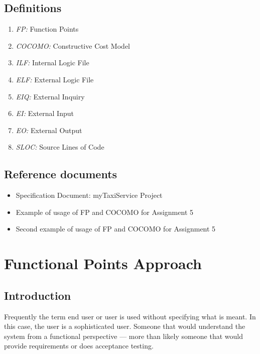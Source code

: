 \documentclass[12pt, oneside]{book}   	%
\begin{document}
\section{Definitions}
\begin{enumerate}
\item \textit{FP:} Function Points
\item \textit{COCOMO:} Constructive Cost Model
\item \textit{ILF:} Internal Logic File
\item \textit{ELF:} External Logic File
\item \textit{EIQ:} External Inquiry
\item \textit{EI:} External Input
\item \textit{EO:} External Output
\item \textit{SLOC:} Source Lines of Code 
\end{enumerate}
\section{Reference documents}
\begin{itemize}
\item Specification Document: myTaxiService Project 
\item Example of usage of FP and COCOMO for Assignment 5
\item Second example of usage of FP and COCOMO for Assignment 5
\end{itemize}
\chapter{Functional Points Approach}
\section{Introduction}
Frequently the term end user or user is used without specifying what is meant. In this case, the user is a sophisticated user. Someone that would understand the system from a functional perspective --- more than likely someone that would provide requirements or does acceptance testing. 
\end{document}
